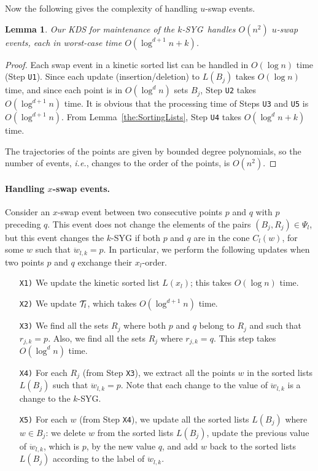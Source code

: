 \documentclass[preprint,12pt]{elsarticle}
\def\ksyg{\mbox{$k$-SYG}}
\newcommand{\ie}{\emph{i.e.}}
\newtheorem{lemma}{Lemma}[section]
\begin{document}
Now the following gives the complexity of handling $u$-swap events.


\begin{lemma}\label{the:UswapEvents}
Our KDS for maintenance of the \ksyg~handles $O(n^2)$ $u$-swap events, each in worst-case time $O(\log^{d+1}n +k)$.
\end{lemma}
\begin{proof}
Each swap event in a kinetic sorted list can be handled in $O(\log n)$ time (Step \texttt{U1}). Since each update (insertion/deletion) to $L(B_j)$ takes $O(\log n)$ time, and since each point is in $O(\log^d n)$ sets $B_j$, Step \texttt{U2} takes $O(\log^{d+1}n)$ time. It is obvious that the processing time of Steps \texttt{U3} and \texttt{U5} is $O(\log^{d+1} n)$. From Lemma~\ref{the:SortingLists}, Step \texttt{U4} takes $O(\log^d n +k)$ time.

The trajectories of the points are given by  bounded degree polynomials, so the number of events, \ie, changes to the order of the points, is $O(n^2)$.
\end{proof}

\paragraph{Handling $x$-swap events.}
Consider an $x$-swap event between two consecutive points $p$ and $q$ with $p$ preceding $q$. This event does not change the elements of the pairs $(B_j,R_j)\in \Psi_l$, but this event changes the $k$-SYG if both $p$ and $q$ are in the cone $C_l(w)$, for some $w$ such that $\ddot{w}_{l,k}=p$. In particular, we perform the following updates when two points $p$ and $q$ exchange their $x_l$-order.
\begin{enumerate}
\item[\texttt{X1)}] We update the kinetic sorted list $L(x_l)$; this takes $O(\log n)$ time.
\item[\texttt{X2)}] We update ${\cal T}_l$, which takes $O(\log ^{d+1} n)$ time.
\item[\texttt{X3)}] We find all the sets $R_j$ where both $p$ and $q$ belong to $R_j$ and such that $r_{j,k}=p$. Also, we find all the sets $R_j$ where $r_{j,k}=q$. This step takes $O(\log^d n)$ time.
\item[\texttt{X4)}] For each $R_j$ (from Step \texttt{X3}), we extract all the points $w$ in the sorted lists $L(B_j)$ such that $\ddot{w}_{l,k}=p$. Note that each change to the value of $\ddot{w}_{l,k}$ is a change to the \ksyg.
\item[\texttt{X5)}] For each $w$ (from Step \texttt{X4}), we update all the sorted lists $L(B_j)$ where $w\in B_j$: we delete $w$ from the sorted lists $L(B_j)$, update the previous value of $\ddot{w}_{l,k}$, which is $p$, by the new value $q$, and add $w$ back to the sorted lists $L(B_j)$ according to the label of $\ddot{w}_{l,k}$.
\end{enumerate}
\end{document}

